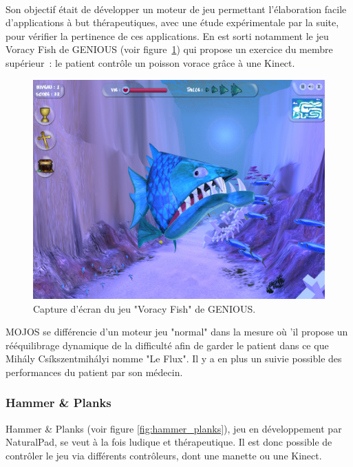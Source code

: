 \paragraph{}
Son objectif était de développer un moteur de jeu permettant 
l'élaboration facile d'applications à but thérapeutiques, avec une étude 
expérimentale
par la suite, pour vérifier la pertinence de ces applications. En est sorti 
notamment le jeu Voracy Fish de GENIOUS (voir figure~\ref{fig:voracy_fish})
qui propose un exercice du membre supérieur~: le patient contrôle un poisson 
vorace grâce à une Kinect.

\begin{figure}[h!]
\centering
\includegraphics[width=0.8\linewidth]{images/voracy_fish}
\caption{Capture d'écran du jeu "Voracy Fish" de GENIOUS.}
\label{fig:voracy_fish}
\end{figure}

MOJOS se différencie d'un moteur jeu "normal" dans la mesure où 'il propose
un rééquilibrage dynamique de la difficulté afin de garder le patient dans
ce que Mihály Csíkszentmihályi nomme "Le Flux"\cite{flow}. Il y a en plus un suivie possible 
des performances du patient par son médecin.

\subsubsection{Hammer \& Planks}
Hammer \& Planks (voir figure \ref{fig:hammer_planks}), jeu en développement par NaturalPad, se veut à la fois 
ludique et thérapeutique. Il est donc possible de contrôler le jeu via différents contrôleurs, dont une manette ou une Kinect.

